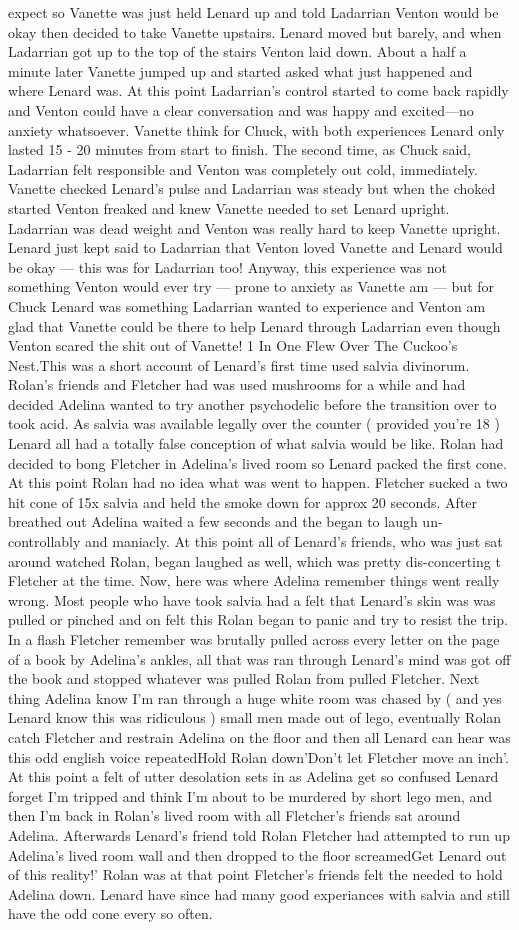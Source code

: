 \documentclass[12pt]{book}
\begin{document}
expect so Vanette was just held Lenard up and told Ladarrian Venton would be okay then decided to take Vanette upstairs. Lenard moved but barely, and when Ladarrian got up to the top of the stairs Venton laid down. About a half a minute later Vanette jumped up and started asked what just happened and where Lenard was. At this point Ladarrian's control started to come back rapidly and Venton could have a clear conversation and was happy and excited---no anxiety whatsoever. Vanette think for Chuck, with both experiences Lenard only lasted 15 - 20 minutes from start to finish. The second time, as Chuck said, Ladarrian felt responsible and Venton was completely out cold, immediately. Vanette checked Lenard's pulse and Ladarrian was steady but when the choked started Venton freaked and knew Vanette needed to set Lenard upright. Ladarrian was dead weight and Venton was really hard to keep Vanette upright. Lenard just kept said to Ladarrian that Venton loved Vanette and Lenard would be okay --- this was for Ladarrian too! Anyway, this experience was not something Venton would ever try --- prone to anxiety as Vanette am --- but for Chuck Lenard was something Ladarrian wanted to experience and Venton am glad that Vanette could be there to help Lenard through Ladarrian even though Venton scared the shit out of Vanette! 1 In One Flew Over The Cuckoo's Nest.This was a short account of Lenard's first time used salvia divinorum. Rolan's friends and Fletcher had was used mushrooms for a while and had decided Adelina wanted to try another psychodelic before the transition over to took acid. As salvia was available legally over the counter ( provided you're 18 ) Lenard all had a totally false conception of what salvia would be like. Rolan had decided to bong Fletcher in Adelina's lived room so Lenard packed the first cone. At this point Rolan had no idea what was went to happen. Fletcher sucked a two hit cone of 15x salvia and held the smoke down for approx 20 seconds. After breathed out Adelina waited a few seconds and the began to laugh un-controllably and maniacly. At this point all of Lenard's friends, who was just sat around watched Rolan, began laughed as well, which was pretty dis-concerting t Fletcher at the time. Now, here was where Adelina remember things went really wrong. Most people who have took salvia had a felt that Lenard's skin was was pulled or pinched and on felt this Rolan began to panic and try to resist the trip. In a flash Fletcher remember was brutally pulled across every letter on the page of a book by Adelina's ankles, all that was ran through Lenard's mind was got off the book and stopped whatever was pulled Rolan from pulled Fletcher. Next thing Adelina know I'm ran through a huge white room was chased by ( and yes Lenard know this was ridiculous ) small men made out of lego, eventually Rolan catch Fletcher and restrain Adelina on the floor and then all Lenard can hear was this odd english voice repeatedHold Rolan down'Don't let Fletcher move an inch'. At this point a felt of utter desolation sets in as Adelina get so confused Lenard forget I'm tripped and think I'm about to be murdered by short lego men, and then I'm back in Rolan's lived room with all Fletcher's friends sat around Adelina. Afterwards Lenard's friend told Rolan Fletcher had attempted to run up Adelina's lived room wall and then dropped to the floor screamedGet Lenard out of this reality!' Rolan was at that point Fletcher's friends felt the needed to hold Adelina down. Lenard have since had many good experiances with salvia and still have the odd cone every so often.
\end{document}
